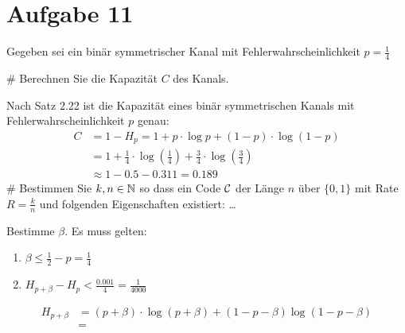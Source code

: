 
\setcounter{MaxMatrixCols}{20}

\section*{Aufgabe 11}
Gegeben sei ein binär symmetrischer Kanal mit Fehlerwahrscheinlichkeit $p = \frac{1}{4}$
\begin{myList}
#
Berechnen Sie die Kapazität $C$ des Kanals.

Nach Satz 2.22 ist die Kapazität eines binär symmetrischen Kanals mit Fehlerwahrscheinlichkeit $p$ genau:
\begin{align*}
	C &= 1 - H_p = 1 + p \cdot \log p + (1-p)\cdot \log (1-p) \\
	&= 1 + \frac{1}{4} \cdot \log \left(\frac{1}{4}\right) + \frac{3}{4}\cdot \log \left(\frac{3}{4}\right) \\
	&\approx 1 -0.5 -0.311 = 0.189
\end{align*} 
#
Bestimmen Sie $k,n \in \mathbb{N}$ so dass ein Code $\mathcal{C}$ der Länge $n$ über $\lbrace 0,1 \rbrace$ mit Rate $R = \frac{k}{n}$ und folgenden Eigenschaften existiert: \ldots

Bestimme $\beta$.
Es muss gelten:
\begin{enumerate}
	\item $\beta \leq \frac{1}{2} - p = \frac{1}{4}$
	\item $ H_{p+\beta} - H_{p} < \frac{0.001}{4} = \frac{1}{4000}$
\end{enumerate}

\begin{align*}
	H_{p+\beta} &= (p + \beta)\cdot \log(p + \beta) + (1 - p - \beta) \log(1 - p - \beta)\\
	&= 
\end{align*}
\end{myList}

